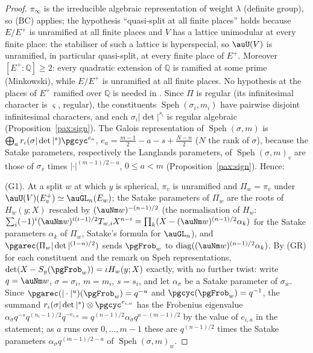 \documentclass[10pt]{amsart}
\theoremstyle{definition}
\theoremstyle{remark}
\newcommand{\Q}{\mathbb Q}
\begin{document}
\begin{proof}
$\pi_\infty$ is the irreducible algebraic representation of weight $\lambda$ (definite group), so
(BC) applies; the hypothesis ``quasi-split at all finite places'' holds because $E/E^+$ is
unramified at all finite places and $V$ has a lattice unimodular at every finite place: the
stabiliser of such a lattice is hyperspecial, so $\auU(V)$ is unramified, in particular
quasi-split, at every finite place of $E^+$. Moreover $[E^+:\Q]\ge2$: every quadratic
extension of $\Q$ is ramified at some prime (Minkowski), while $E/E^+$ is unramified at all
finite places. No hypothesis at the places of $E^+$ ramified over $\Q$ is needed in
\cite{Labesse}. Since $\Pi$ is
regular (its infinitesimal character is $\varsigma$, regular), the constituents
$\operatorname{Speh}(\sigma_i,m_i)$ have pairwise disjoint infinitesimal characters, and each
$\sigma_i|\det|^{s_i}$ is regular algebraic (Proposition~\ref{pax:sign}). The Galois representation
of $\operatorname{Speh}(\sigma,m)$ is $\bigoplus_ar_\iota(\sigma|\det|^{s})\pgcyc^{e_a}$, $e_a=
\frac{m-1}2-a-s+\frac{N-n}2$ ($N$ the rank of $\sigma$), because the Satake parameters, respectively
the Langlands parameters, of $\operatorname{Speh}(\sigma,m)_v$ are those of $\sigma_v$ times
$|\cdot|^{(m-1)/2-a}$, $0\le a<m$ (Proposition~\ref{pax:sign}). Hence:

(G1). At a split $w$ at which $y$ is spherical, $\pi_v$ is unramified and $\Pi_w=\pi_v$ under
$\auU(V)(E^+_v)\simeq\auGL_n(E_w)$; the Satake parameters of $\Pi_w$ are the roots of
$H_w(y;X)$ rescaled by $(\auNm w)^{-(n-1)/2}$ (the normalisation of $H_w$: $\sum_i(-1)^i(\auNm
w)^{i(i-1)/2}T_{w,i}X^{n-i}=\prod_k(X-(\auNm w)^{(n-1)/2}\alpha_k)$ for the Satake parameters
$\alpha_k$ of $\Pi_w$, Satake's formula for $\auGL_n$), and $\pgarec(\Pi_w|\det|^{(1-n)/2})$ sends
$\pgFrob_w$ to $\operatorname{diag}((\auNm w)^{(n-1)/2}\alpha_k)$. By (GR) for each constituent
and the remark on Speh representations, $\det(X-S_y(\pgFrob_w))=\iota H_w(y;X)$ exactly, with no further twist: write
$q=\auNm w$, $\sigma=\sigma_i$, $m=m_i$, $s=s_i$, and let $\alpha_\sigma$ be a Satake parameter of
$\sigma_w$. Since $\pgarec(|\cdot|^u)(\pgFrob_w)=q^{-u}$ and $\pgcyc(\pgFrob_w)=q^{-1}$, the summand
$r_\iota(\sigma|\det|^{s})\otimes\pgcyc^{e_{i,a}}$ has the Frobenius eigenvalue
$\alpha_\sigma q^{-s}q^{(n_i-1)/2}q^{-e_{i,a}}=q^{(n-1)/2}\alpha_\sigma q^{a-(m-1)/2}$ by the
value of $e_{i,a}$ in the statement; as $a$ runs over $0,\dots,m-1$ these are $q^{(n-1)/2}$
times the Satake parameters $\alpha_\sigma q^{(m-1)/2-a}$ of $\operatorname{Speh}(\sigma,m)_w$.


\end{proof}
\end{document}
